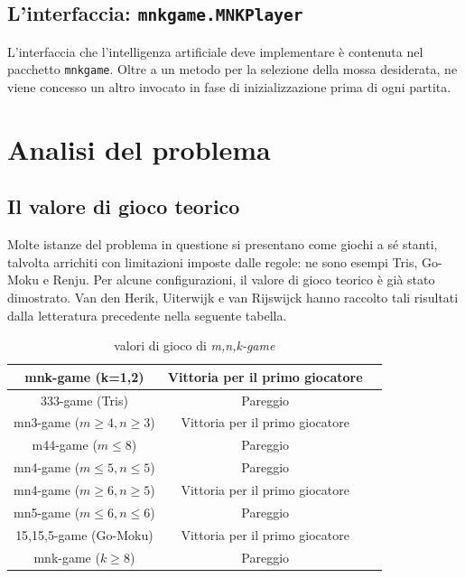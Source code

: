 \documentclass{article}
\begin{document}
\subsection{L'interfaccia: \texttt{mnkgame.MNKPlayer}}

L'interfaccia che l'intelligenza artificiale deve implementare è contenuta nel
pacchetto \verb!mnkgame!. Oltre a un metodo per la selezione della mossa
desiderata, ne viene concesso un altro invocato in fase di inizializzazione
prima di ogni partita.

\section{Analisi del problema}

\subsection{Il valore di gioco teorico}

Molte istanze del problema in questione si presentano come giochi a sé stanti,
talvolta arrichiti con limitazioni imposte dalle regole: ne sono esempi Tris,
Go-Moku e Renju. Per alcune configurazioni, il valore di gioco teorico è già
stato dimostrato. Van den Herik, Uiterwijk e van Rijswijck
\cite{VANDENHERIK2002277} hanno raccolto tali risultati dalla letteratura
precedente nella seguente tabella.

\begin{table}[h!]
  \centering
  \begin{tabular}{ | c | c | c | }
    \hline
    mnk-game (k=1,2) & Vittoria per il primo giocatore \\
    \hline
    333-game (Tris) & Pareggio \\
    \hline
    mn3-game ($m \geq 4, n \geq 3$) & Vittoria per il primo giocatore \\
    \hline
    m44-game ($m \leq 8$) & Pareggio \\
    \hline
    mn4-game ($m \leq 5,n \leq 5$) & Pareggio \\
    \hline
    mn4-game ($m \geq 6,n \geq 5$) & Vittoria per il primo giocatore \\
    \hline
    mn5-game ($m \leq 6,n \leq 6$) & Pareggio \\
    \hline
    15,15,5-game (Go-Moku) & Vittoria per il primo giocatore \\
    \hline
    mnk-game ($k \geq 8$) & Pareggio \\
    \hline
  \end{tabular}
    \caption{valori di gioco di \emph{m,n,k-game}}
    \label{table:2}
  \end{table}
\end{document}
